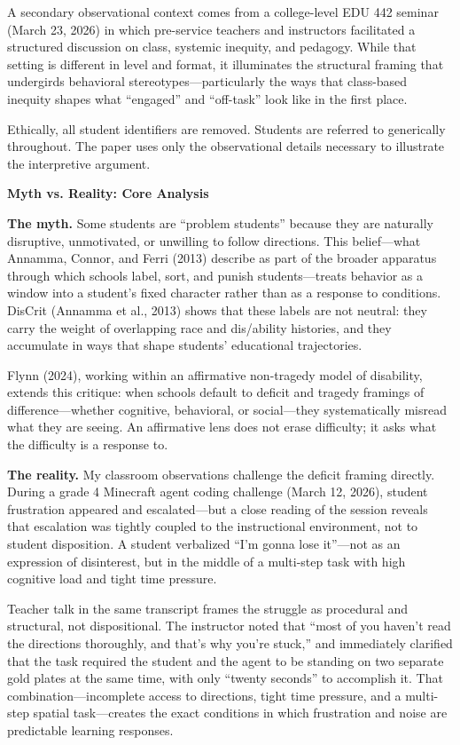 \documentclass[12pt]{article}
\newcommand{\apaheading}[1]{\begin{center}\textbf{#1}\end{center}}
\begin{document}
A secondary observational context comes from a college-level EDU 442 seminar (March 23, 2026) in which pre-service teachers and instructors facilitated a structured discussion on class, systemic inequity, and pedagogy. While that setting is different in level and format, it illuminates the structural framing that undergirds behavioral stereotypes---particularly the ways that class-based inequity shapes what ``engaged'' and ``off-task'' look like in the first place.

Ethically, all student identifiers are removed. Students are referred to generically throughout. The paper uses only the observational details necessary to illustrate the interpretive argument.

\apaheading{Myth vs. Reality: Core Analysis}

\textbf{The myth.} Some students are ``problem students'' because they are naturally disruptive, unmotivated, or unwilling to follow directions. This belief---what Annamma, Connor, and Ferri (2013) describe as part of the broader apparatus through which schools label, sort, and punish students---treats behavior as a window into a student's fixed character rather than as a response to conditions. DisCrit (Annamma et al., 2013) shows that these labels are not neutral: they carry the weight of overlapping race and dis/ability histories, and they accumulate in ways that shape students' educational trajectories.

Flynn (2024), working within an affirmative non-tragedy model of disability, extends this critique: when schools default to deficit and tragedy framings of difference---whether cognitive, behavioral, or social---they systematically misread what they are seeing. An affirmative lens does not erase difficulty; it asks what the difficulty is a response to.

\textbf{The reality.} My classroom observations challenge the deficit framing directly. During a grade 4 Minecraft agent coding challenge (March 12, 2026), student frustration appeared and escalated---but a close reading of the session reveals that escalation was tightly coupled to the instructional environment, not to student disposition. A student verbalized ``I'm gonna lose it''---not as an expression of disinterest, but in the middle of a multi-step task with high cognitive load and tight time pressure.

Teacher talk in the same transcript frames the struggle as procedural and structural, not dispositional. The instructor noted that ``most of you haven't read the directions thoroughly, and that's why you're stuck,'' and immediately clarified that the task required the student and the agent to be standing on two separate gold plates at the same time, with only ``twenty seconds'' to accomplish it. That combination---incomplete access to directions, tight time pressure, and a multi-step spatial task---creates the exact conditions in which frustration and noise are predictable learning responses.
\end{document}
